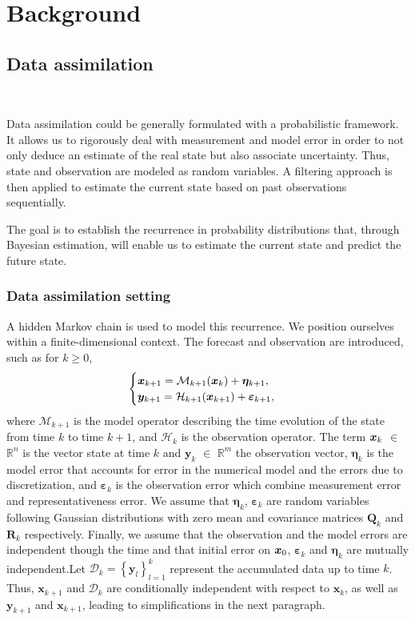 
\section{Background}

\subsection{Data assimilation}~\label{Background_DA}

Data assimilation could be generally formulated with a probabilistic framework. It allows us to rigorously deal with measurement and model error in order to not only deduce an estimate of the real state but also associate uncertainty. Thus, state and observation are modeled as random variables. A filtering approach is then applied to estimate the current state based on past observations sequentially.

The goal is to establish the recurrence in probability distributions that, through Bayesian estimation, will enable us to estimate the current state and predict the future state.


\subsubsection{Data assimilation setting}

A hidden Markov chain is used to model this recurrence. We position ourselves within a finite-dimensional context. The forecast and observation are introduced, such as for $ k \geq 0$,
\[
    \begin{cases}
        \bm{x}_{k+1} = \mathcal{M}_{k+1} (\bm{x}_{k}) + \bm{\eta}_{k+1}, \\
        \bm{y}_{k+1} = \mathcal{H}_{k+1} (\bm{x}_{k+1}) + \bm \varepsilon_{k+1},
    \end{cases}
\]where $\mathcal{M}_{k+1}$ is the model operator describing the time evolution of the state from time $k$ to time $k+1$, and $\mathcal{H}_k$ is the observation operator. The term $\bm{x}_k$ $\in$ $\mathbb{R}^n$ is the vector state at time $k$ and $\bm{y}_k$ $\in$ $\mathbb{R}^m$ the observation vector, $\bm{\eta}_{k}$ is the model error that accounts for error in the numerical model and the errors due to discretization, and $\bm{\varepsilon}_k$ is the observation error which combine measurement error and representativeness error. We assume that $\bm{\eta}_{k}$, $\bm{\varepsilon}_k$ are random variables following Gaussian distributions with zero mean and covariance matrices $\bm Q_k$ and $\bm R_k$ respectively. Finally, we assume that the observation and the model errors are independent though the time and that initial error on $\bm{x}_0$, $\bm{\varepsilon}_k$ and $\bm{\eta}_{k}$ are mutually independent.Let $\mathcal{D}_k = \left\{\bm y_l\right\}_{l=1}^k$ represent the accumulated data up to time $k$.
Thus, $\bm x_{k+1}$ and $\mathcal{D}_k$ are conditionally independent with respect to $\bm x_{k}$, as well as $\bm{y}_{k+1}$ and $\bm x_{k+1}$, leading to simplifications in the next paragraph.

